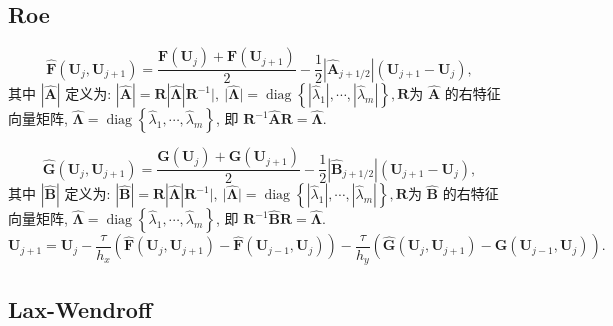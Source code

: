 \documentclass[12pt]{article}
\begin{document}
\subsection{Roe}

\begin{equation}
	\hat{\boldsymbol{F}}\left(\boldsymbol{U}_{j}, \boldsymbol{U}_{j+1}\right)=\frac{\boldsymbol{F}\left(\boldsymbol{U}_{j}\right)+\boldsymbol{F}\left(\boldsymbol{U}_{j+1}\right)}{2}-\frac{1}{2}\left|\hat{\boldsymbol{A}}_{j+1 / 2}\right|\left(\boldsymbol{U}_{j+1}-\boldsymbol{U}_{j}\right),
\end{equation}
其中 $|\hat{\boldsymbol{A}}|$ 定义为: $|\hat{\boldsymbol{A}}|=\boldsymbol{R}|\hat{\boldsymbol{\Lambda}}| \boldsymbol{R}^{-1}|,\ | \hat{\boldsymbol{\Lambda}} \mid=\operatorname{diag}\left\{\left|\hat{\lambda}_{1}\right|, \cdots,\left|\hat{\lambda}_{m}\right|\right\}, \boldsymbol{R}$为 $\hat{\boldsymbol{A}}$ 的右特征向量矩阵, $\hat{\boldsymbol{\Lambda}}=\operatorname{diag}\left\{\hat{\lambda}_{1}, \cdots, \hat{\lambda}_{m}\right\}$, 即 $\boldsymbol{R}^{-1} \hat{\boldsymbol{A}} \boldsymbol{R}=\hat{\boldsymbol{\Lambda}}$.

\begin{equation}
	\hat{\boldsymbol{G}}\left(\boldsymbol{U}_{j}, \boldsymbol{U}_{j+1}\right)=\frac{\boldsymbol{G}\left(\boldsymbol{U}_{j}\right)+\boldsymbol{G}\left(\boldsymbol{U}_{j+1}\right)}{2}-\frac{1}{2}\left|\hat{\boldsymbol{B}}_{j+1 / 2}\right|\left(\boldsymbol{U}_{j+1}-\boldsymbol{U}_{j}\right),
\end{equation}
其中 $|\hat{\boldsymbol{B}}|$ 定义为: $|\hat{\boldsymbol{B}}|=\boldsymbol{R}|\hat{\boldsymbol{\Lambda}}| \boldsymbol{R}^{-1}|,\ | \hat{\boldsymbol{\Lambda}} \mid=\operatorname{diag}\left\{\left|\hat{\lambda}_{1}\right|, \cdots,\left|\hat{\lambda}_{m}\right|\right\}, \boldsymbol{R}$为 $\hat{\boldsymbol{B}}$ 的右特征向量矩阵, $\hat{\boldsymbol{\Lambda}}=\operatorname{diag}\left\{\hat{\lambda}_{1}, \cdots, \hat{\lambda}_{m}\right\}$, 即 $\boldsymbol{R}^{-1} \hat{\boldsymbol{B}} \boldsymbol{R}=\hat{\boldsymbol{\Lambda}}$.
\begin{equation}
	\bm{U}_{j+1} = \bm{U}_j - \frac{\tau}{h_x}\left(\hat{\bm{F}}\left(\bm{U}_j,\bm{U}_{j+1}\right)-\hat{\bm{F}}\left(\bm{U}_{j-1},\bm{U}_{j}\right)\right)-\frac{\tau}{h_y}\left(\hat{\bm{G}}\left(\bm{U}_j,\bm{U}_{j+1}\right)-\hat{\bm{G}}\left(\bm{U}_{j-1},\bm{U}_{j}\right)\right).
\end{equation}


\subsection{Lax-Wendroff}
\end{document}
